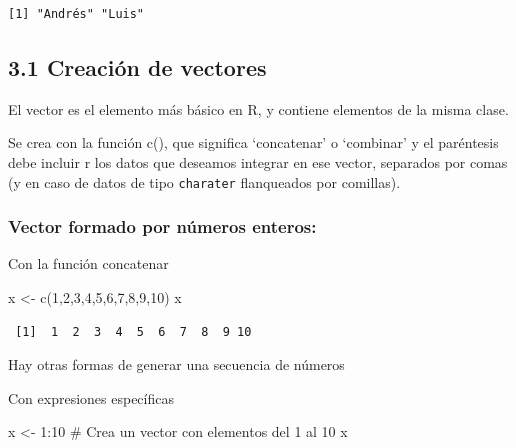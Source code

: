 \documentclass[
  letterpaper,
]{scrbook}
\newenvironment{Shaded}{\begin{snugshade}}{\end{snugshade}}
\newcommand{\CommentTok}[1]{\textcolor[rgb]{0.37,0.37,0.37}{#1}}
\newcommand{\DecValTok}[1]{\textcolor[rgb]{0.68,0.00,0.00}{#1}}
\newcommand{\FunctionTok}[1]{\textcolor[rgb]{0.28,0.35,0.67}{#1}}
\newcommand{\NormalTok}[1]{\textcolor[rgb]{0.00,0.23,0.31}{#1}}
\newcommand{\OtherTok}[1]{\textcolor[rgb]{0.00,0.23,0.31}{#1}}
\newcommand{\SpecialCharTok}[1]{\textcolor[rgb]{0.37,0.37,0.37}{#1}}
\begin{document}
\begin{verbatim}
[1] "Andrés" "Luis"  
\end{verbatim}

\hypertarget{creaciuxf3n-de-vectores}{%
\subsection{\texorpdfstring{\textbf{3.1 Creación de
vectores}}{3.1 Creación de vectores}}\label{creaciuxf3n-de-vectores}}

El vector es el elemento más básico en R, y contiene elementos de la
misma clase.

Se crea con la función c(), que significa `concatenar' o `combinar' y el
paréntesis debe incluir r los datos que deseamos integrar en ese vector,
separados por comas (y en caso de datos de tipo \texttt{charater}
flanqueados por comillas).

\hypertarget{vector-formado-por-nuxfameros-enteros}{%
\subsubsection{Vector formado por números
enteros:}\label{vector-formado-por-nuxfameros-enteros}}

Con la función concatenar

\begin{Shaded}
\begin{Highlighting}[]
\NormalTok{x }\OtherTok{\textless{}{-}} \FunctionTok{c}\NormalTok{(}\DecValTok{1}\NormalTok{,}\DecValTok{2}\NormalTok{,}\DecValTok{3}\NormalTok{,}\DecValTok{4}\NormalTok{,}\DecValTok{5}\NormalTok{,}\DecValTok{6}\NormalTok{,}\DecValTok{7}\NormalTok{,}\DecValTok{8}\NormalTok{,}\DecValTok{9}\NormalTok{,}\DecValTok{10}\NormalTok{)}
\NormalTok{x}
\end{Highlighting}
\end{Shaded}

\begin{verbatim}
 [1]  1  2  3  4  5  6  7  8  9 10
\end{verbatim}

Hay otras formas de generar una secuencia de números

Con expresiones específicas

\begin{Shaded}
\begin{Highlighting}[]
\NormalTok{x }\OtherTok{\textless{}{-}} \DecValTok{1}\SpecialCharTok{:}\DecValTok{10}
\CommentTok{\# Crea un vector con elementos del 1 al 10}
\NormalTok{x}
\end{Highlighting}
\end{Shaded}
\end{document}
